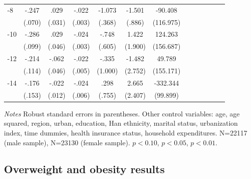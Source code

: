 \begin{table}[p]
\begin{adjustbox}{max width=\linewidth}
\begin{threeparttable}
{\begin{tabular}{l*{6}{SS}}
-8             &    -.247\sym{***}&     .029         &    -.022\sym{***}&   -1.073\sym{***}&   -1.501\sym{*}  &  -90.408         \\
                &   (.070)         &   (.031)         &   (.003)         &   (.368)         &   (.886)         &(116.975)         \\
-10            &    -.286\sym{***}&     .029         &    -.024\sym{***}&    -.748         &    1.422         &  124.263         \\
                &   (.099)         &   (.046)         &   (.003)         &   (.605)         &  (1.900)         &(156.687)         \\
-12           &    -.214\sym{*}  &    -.062         &    -.022\sym{***}&    -.335         &   -1.482         &   49.789         \\
                &   (.114)         &   (.046)         &   (.005)         &  (1.000)         &  (2.752)         &(155.171)         \\
-14           &    -.176         &    -.022\sym{*}  &    -.024\sym{***}&     .298         &    2.665         & -332.344\sym{***}\\
                &   (.153)         &   (.012)         &   (.006)         &   (.755)         &  (2.407)         & (99.899)         \\ 
\bottomrule
\end{tabular}
\begin{tablenotes}
\item \textit{Notes}   Robust standard errors in parentheses.
Other control variables: age, age squared, region, urban, education, Han ethnicity, marital status, urbanization index, time dummies, health insurance status, household expenditures. N=22117 (male sample), N=23130 (female sample). \sym{*} \(p<0.10\), \sym{**} \(p<0.05\), \sym{***} \(p<0.01\).
\end{tablenotes}
}
\end{threeparttable}
\end{adjustbox}
\end{table}


\FloatBarrier
\clearpage




\subsection*{Overweight and obesity results}

